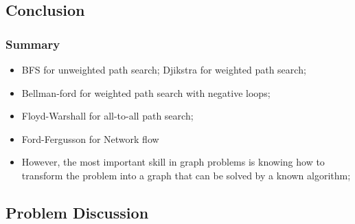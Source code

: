 \documentclass{beamer}
\begin{document}
\subsection{Conclusion}
\begin{frame}
  \frametitle{Summary}
  \begin{itemize}
  \item BFS for unweighted path search; Djikstra for weighted path search;
  \item Bellman-ford for weighted path search with negative loops;
  \item Floyd-Warshall for all-to-all path search;
  \item Ford-Fergusson for Network flow

    \bigskip

  \item However, the most important skill in graph problems is knowing
    how to transform the problem into a graph that can be solved by a
    known algorithm;
  \end{itemize}
\end{frame}

\subsection{Problem Discussion}


\end{document}
